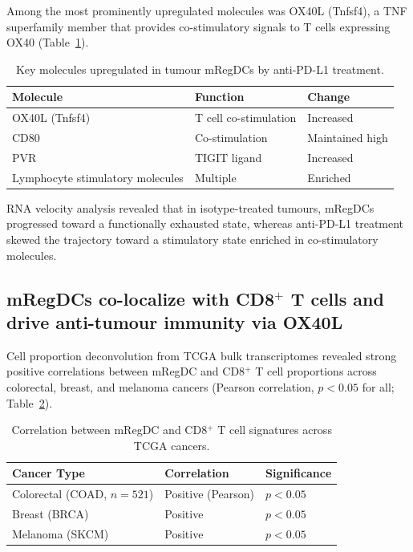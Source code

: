 \documentclass[11pt]{article}
\begin{document}
Among the most prominently upregulated molecules was OX40L (Tnfsf4), a TNF superfamily member that provides co-stimulatory signals to T cells expressing OX40 (Table~\ref{tab:molecules}).

\begin{table}[ht]
\centering
\caption{Key molecules upregulated in tumour mRegDCs by anti-PD-L1 treatment.}
\label{tab:molecules}
\begin{tabular}{lll}
\toprule
Molecule & Function & Change \\
\midrule
OX40L (Tnfsf4) & T cell co-stimulation & Increased \\
CD80 & Co-stimulation & Maintained high \\
PVR & TIGIT ligand & Increased \\
Lymphocyte stimulatory molecules & Multiple & Enriched \\
\bottomrule
\end{tabular}
\end{table}

RNA velocity analysis revealed that in isotype-treated tumours, mRegDCs progressed toward a functionally exhausted state, whereas anti-PD-L1 treatment skewed the trajectory toward a stimulatory state enriched in co-stimulatory molecules.

\subsection{mRegDCs co-localize with CD8$^{+}$ T cells and drive anti-tumour immunity via OX40L}

Cell proportion deconvolution from TCGA bulk transcriptomes revealed strong positive correlations between mRegDC and CD8$^{+}$ T cell proportions across colorectal, breast, and melanoma cancers (Pearson correlation, $p < 0.05$ for all; Table~\ref{tab:correlations}).

\begin{table}[ht]
\centering
\caption{Correlation between mRegDC and CD8$^{+}$ T cell signatures across TCGA cancers.}
\label{tab:correlations}
\begin{tabular}{lll}
\toprule
Cancer Type & Correlation & Significance \\
\midrule
Colorectal (COAD, $n=521$) & Positive (Pearson) & $p < 0.05$ \\
Breast (BRCA) & Positive & $p < 0.05$ \\
Melanoma (SKCM) & Positive & $p < 0.05$ \\
\bottomrule
\end{tabular}
\end{table}
\end{document}
